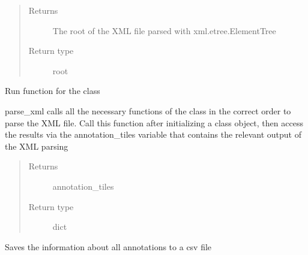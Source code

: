 \documentclass[letterpaper,10pt,english]{sphinxmanual}
\begin{document}
\begin{fulllineitems}
\begin{fulllineitems}
\begin{quote}
\begin{description}
\item[{Returns}] \leavevmode
The root of the XML file parsed with xml.etree.ElementTree

\item[{Return type}] \leavevmode
root

\end{description}\end{quote}

\end{fulllineitems}


\begin{fulllineitems}
\label{\detokenize{index:sites_of_interest_parser.MapsXmlParser.parse_xml}}
Run function for the class

parse\_xml calls all the necessary functions of the class in the correct order to parse the XML file. Call this
function after initializing a class object, then access the results via the annotation\_tiles variable that
contains the relevant output of the XML parsing
\begin{quote}\begin{description}
\item[{Returns}] \leavevmode
annotation\_tiles

\item[{Return type}] \leavevmode
dict

\end{description}\end{quote}

\end{fulllineitems}


\begin{fulllineitems}
\label{\detokenize{index:sites_of_interest_parser.MapsXmlParser.save_annotation_tiles_to_csv}}
Saves the information about all annotations to a csv file


\end{fulllineitems}
\end{fulllineitems}
\end{document}
